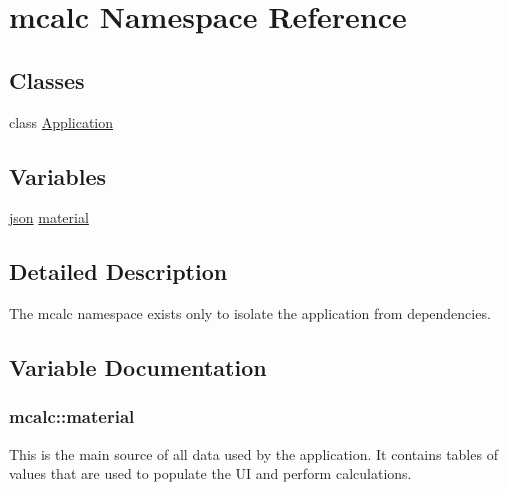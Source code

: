 \hypertarget{namespacemcalc}{}\section{mcalc Namespace Reference}
\label{namespacemcalc}
\subsection*{Classes}
\begin{DoxyCompactItemize}
\item 
class \hyperlink{classmcalc_1_1Application}{Application}
\end{DoxyCompactItemize}
\subsection*{Variables}
\begin{DoxyCompactItemize}
\item 
\hyperlink{application_8hpp_ab701e3ac61a85b337ec5c1abaad6742d}{json} \hyperlink{namespacemcalc_ae5e326e29d88ff26948cb46ed871e27f}{material}
\end{DoxyCompactItemize}


\subsection{Detailed Description}
The mcalc namespace exists only to isolate the application from dependencies. 

\subsection{Variable Documentation}
\subsubsection[{\texorpdfstring{material}{material}}]{ mcalc\+::material}\hypertarget{namespacemcalc_ae5e326e29d88ff26948cb46ed871e27f}{}\label{namespacemcalc_ae5e326e29d88ff26948cb46ed871e27f}
This is the main source of all data used by the application. It contains tables of values that are used to populate the UI and perform calculations. 
